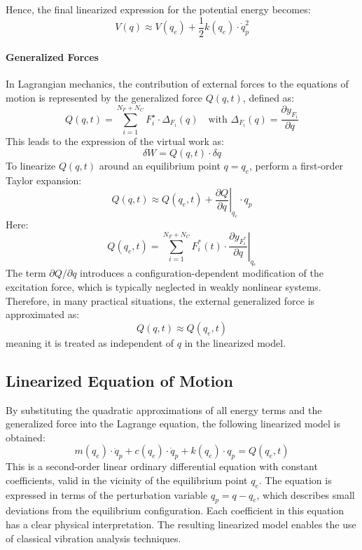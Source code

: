Hence, the final linearized expression for the potential energy becomes:
\[
V(q) \approx V(q_e) + \frac{1}{2} k(q_e) \cdot \dot{q}_p^2
\]

\paragraph{Generalized Forces}

In Lagrangian mechanics, the contribution of external forces to the equations of motion is represented by the generalized force \( Q(q, t) \), defined as:
\[
Q(q,t) = \sum_{i=1}^{N_F + N_C} F_i^\star \cdot \Delta_{F_i}(q) \quad \text{with } \Delta_{F_i}(q) = \frac{\partial y_{F_i}}{\partial q}
\]
This leads to the expression of the virtual work as:
\[
\delta W = Q(q, t) \cdot \delta q
\]
To linearize \( Q(q, t) \) around an equilibrium point \( q = q_e \), perform a first-order Taylor expansion:
\[
Q(q, t) \approx Q(q_e, t) + \left. \frac{\partial Q}{\partial q} \right|_{q_e} \cdot q_p
\]
Here:
\[
Q(q_e, t) = \sum_{i=1}^{N_F + N_C} F_i^*(t) \cdot \left. \frac{\partial y_{F_i^*}}{\partial q} \right|_{q_e}
\]
The term \( \partial Q / \partial q \) introduces a configuration-dependent modification of the excitation force, which is typically neglected in weakly nonlinear systems. Therefore, in many practical situations, the external generalized force is approximated as:
\[
Q(q, t) \approx Q(q_e, t)
\]
meaning it is treated as independent of \( q \) in the linearized model.

\subsection{Linearized Equation of Motion}

By substituting the quadratic approximations of all energy terms and the generalized force into the Lagrange equation, the following linearized model is obtained:
\[
m(q_e) \cdot \ddot{q}_p + c(q_e) \cdot \dot{q}_p + k(q_e) \cdot q_p = Q(q_e, t)
\]
This is a second-order linear ordinary differential equation with constant coefficients, valid in the vicinity of the equilibrium point \( q_e \). The equation is expressed in terms of the perturbation variable \( q_p = q - q_e \), which describes small deviations from the equilibrium configuration. Each coefficient in this equation has a clear physical interpretation. The resulting linearized model enables the use of classical vibration analysis techniques.
